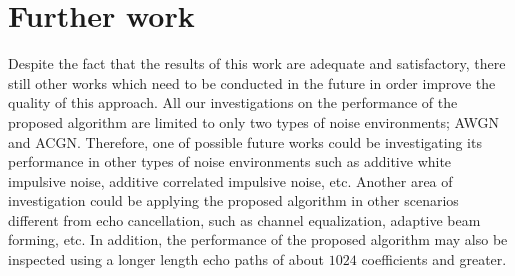 \newpage
\vspace{-0.3cm}
\section{Further work} \label{sec:6.2}\label{sec5.1}
\vspace{-0.5cm}
\noindent Despite the fact that the results of this work are adequate and satisfactory, there still other works which need to be conducted in the future
in order improve the quality of this approach.  All our investigations on the performance of the proposed algorithm are limited to only two types of
noise environments; AWGN and ACGN. Therefore, one of possible future works could be investigating its performance in other types of noise environments
such as additive white impulsive noise, additive correlated impulsive noise, etc.
Another area of investigation could be applying the proposed algorithm in other scenarios different from echo cancellation, such as channel equalization,
adaptive beam forming, etc. In addition, the performance of the proposed algorithm may also be inspected using a longer length echo paths of about $1024$
coefficients and greater.



